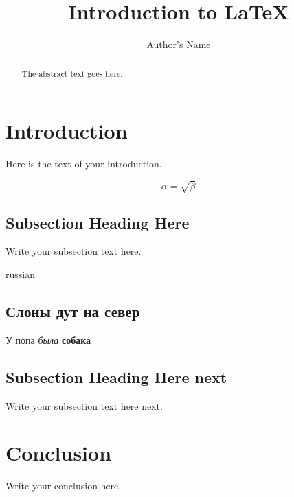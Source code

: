 \documentclass{article}
\begin{document}
\title{Introduction to \LaTeX{}}
\author{Author's Name}

\maketitle

\begin{abstract}
The abstract text goes here.
\end{abstract}

\section{Introduction}
Here is the text of your introduction.

\begin{equation}
    \label{simple_equation}
    \alpha = \sqrt{ \beta }
\end{equation}

\subsection{Subsection Heading Here}
Write your subsection text here.

\begin{otherlanguage*}{russian}
\subsection{Слоны дут на север}
У попа {\it была} {\bf собака}
\end{otherlanguage*}

\subsection{Subsection Heading Here next}
Write your subsection text here next.

\section{Conclusion}
Write your conclusion here.
\end{document}

